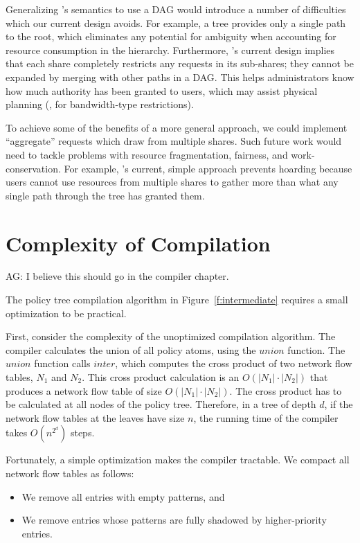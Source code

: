 Generalizing \sys's semantics to use a DAG would introduce a number of difficulties
which our current design avoids. For example, a tree provides only a single path
to the root, which eliminates any potential for ambiguity when accounting for
resource consumption in the hierarchy. Furthermore, \sys's current design implies
that each share completely restricts any requests in its sub-shares; they cannot be
expanded by merging with other paths in a DAG. This helps administrators know
how much authority has been granted to users, which may assist physical planning
(\eg, for bandwidth-type restrictions).

To achieve some of the benefits of a more general approach, we could implement
``aggregate'' requests which draw from multiple shares. Such future work
would need to tackle problems with resource fragmentation, fairness, and work-conservation.
For example, \sys's current, simple approach prevents hoarding because users cannot
use resources from multiple shares to gather more than what any single path through
the tree has granted them.

\section{Complexity of Compilation}

{\color{red} AG: I believe this should go in the compiler chapter.}

The policy tree compilation algorithm in Figure~\ref{f:intermediate} requires
a small optimization to be practical.

First, consider the complexity of the unoptimized compilation
algorithm.  The compiler calculates the union of all policy atoms,
using the $\mathit{union}$ function.  The $\mathit{union}$ function
calls $\mathit{inter}$, which computes the cross product of two
network flow tables, $N_1$ and $N_2$. This cross product calculation
is an $O(|N_1|\cdot|N_2|)$ that produces a network flow table of size
$O(|N_1|\cdot|N_2|)$. The cross product has to be calculated at all
nodes of the policy tree. Therefore, in a tree of depth $d$, if the
network flow tables at the leaves have size $n$, the running time of
the compiler takes $O(n^{2^d})$ steps.

Fortunately, a simple optimization makes the compiler tractable. We compact
all network flow tables as follows:
\begin{itemize}

\item We remove all entries with empty patterns, and

\item We remove entries whose patterns are fully shadowed by higher-priority
  entries.

\end{itemize}

